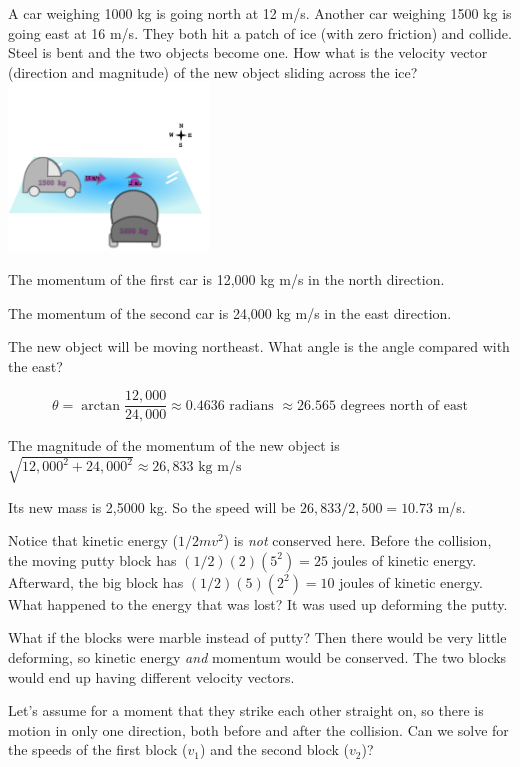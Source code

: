 \begin{Exercise}[title={Cars on Ice}, label=cars_on_ice]
A car weighing 1000 kg is going north at 12 m/s.  Another car weighing
1500 kg is going east at 16 m/s.  They both hit a patch of ice (with
zero friction) and collide.  Steel is bent and the two objects become
one.  How what is the velocity vector (direction and magnitude) of the
new object sliding across the ice?
\includegraphics[width=0.4\textwidth]{Car_Ice.png}

\end{Exercise}
\begin{Answer}[ref=cars_on_ice]
  The momentum of the first car is 12,000 kg m/s in the north direction.

  The momentum of the second car is 24,000 kg m/s in the east direction.

  The new object will be moving northeast. What angle is the angle compared with the east?

  $$\theta = \arctan{\frac{12,000}{24,000}} \approx 0.4636 \text{ radians } \approx 26.565\text{ degrees north of east}$$

  The magnitude of the momentum of the new object is $\sqrt{12,000^2 + 24,000^2} \approx 26,833\text{ kg m/s}$

  Its new mass is 2,5000 kg.  So the speed will be $26,833/2,500 = 10.73$ m/s.
\end{Answer}


Notice that kinetic energy ($1/2 m v^2$) is \emph{not} conserved
here.  Before the collision, the moving putty block has $(1/2)(2)(5^2) = 25$
joules of kinetic energy.  Afterward, the big block has $(1/2)(5)(2^2)
= 10$ joules of kinetic energy.  What happened to the energy that was
lost? It was used up deforming the putty.

What if the blocks were marble instead of putty?  Then there would be
very little deforming, so kinetic energy \emph{and} momentum would be
conserved. The two blocks would end up having different velocity
vectors.

Let's assume for a moment that they strike each other straight on, so
there is motion in only one direction, both before and after the
collision.  Can we solve for the speeds of the first block ($v_1$) and
the second block ($v_2$)?

